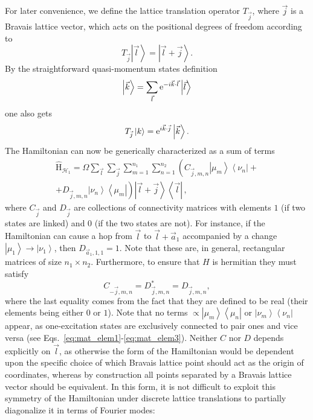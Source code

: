 \documentclass[prl,aps,twocolumn,showpacs,superscriptaddress,longbibliography]{revtex4-1}
\newcommand{\be}{\begin{equation}}
\newcommand{\ee}{\end{equation}}
\newcommand{\mal}{\mathcal}
\newcommand{\rme}[1]{{\rm{e}}^{#1}}
\newcommand{\lt}{\left(}
\newcommand{\rt}{\right)}
\newcommand{\lan}{\left\langle}
\newcommand{\ran}{\right\rangle}
\newcommand{\ket}[1]{\left| #1 \ran}
\newcommand{\bra}[1]{\lan #1 \right|}
\newcommand{\op}[1]{\mathrm{\hat{#1}}}
\begin{document}
For later convenience, we define the lattice translation operator $T_{\vec{j}}$, where $\vec{j}$ is a Bravais lattice vector, which acts on the positional degrees of freedom according to
\be
	T_{\vec{j}} \ket{\vec{l}} = \ket{\vec{l} + \vec{j}}.
\ee
By the straightforward quasi-momentum states definition
\be
	\ket{\vec{k}} =  \sum_{\vec{l}} \rme{-i \vec{k} \cdot \vec{l}}  \ket{\vec{l}}
\ee
one also gets
\be
	T_{\vec{j}} \ket{k} = \rme{i\vec{k} \cdot \vec{j}} \ket{\vec{k}}.
\ee
The Hamiltonian can now be generically characterized as a sum of terms 
\be
\begin{split}
	\op{H}_{\mal{H}_1} = \Omega \sum_{\vec{l}}   \sum_{\vec{j}} \sum_{m= 1}^{n_1} \sum_{n=1}^{n_2} \lt C_{\vec{j},m,n}   \ket{\mu_m} \bra{\nu_n}   + \right. \\
	+ \left. D_{\vec{j},m,n}   \ket{\nu_n} \bra{\mu_m}   \rt \ket{\vec{l} + \vec{j}}  \bra{\vec{l}}  \, ,
\end{split}
\ee
where $C_{\vec{j}}$ and $D_{\vec{j}}$ are collections of connectivity matrices with elements $1$ (if two states are linked) and $0$ (if the two states are not). For instance, if the Hamiltonian can cause a hop from $\vec{l}$ to $\vec{l} + \vec{a}_1$ accompanied by a change $\ket{\mu_1} \to \ket{\nu_1}$, then $D_{\vec{a}_1,1,1} = 1$. Note that these are, in general, rectangular matrices of size $n_1 \times n_2$. Furthermore, to ensure that $H$ is hermitian they must satisfy
\be
	C_{-\vec{j},m,n} = D_{\vec{j},m,n}^\ast = D_{\vec{j},m,n},
\ee
where the last equality comes from the fact that they are defined to be real (their elements being either $0$ or $1$). Note that no terms $\propto \ket{\mu_m} \bra{\mu_n} $ or $\ket{\nu_m} \bra{\nu_n} $ appear, as one-excitation states are exclusively connected to pair ones and vice versa (see Eqs.~\eqref{eq:mat_elem1}-\eqref{eq:mat_elem3}). Neither $C$ nor $D$ depends explicitly on $\vec{l}$, as otherwise the form of the Hamiltonian would be dependent upon the specific choice of which Bravais lattice point should act as the origin of coordinates, whereas by construction all points separated by a Bravais lattice vector should be equivalent. In this form, it is not difficult to exploit this  symmetry of the Hamiltonian under discrete lattice translations to partially diagonalize it in terms of Fourier modes:
\end{document}
